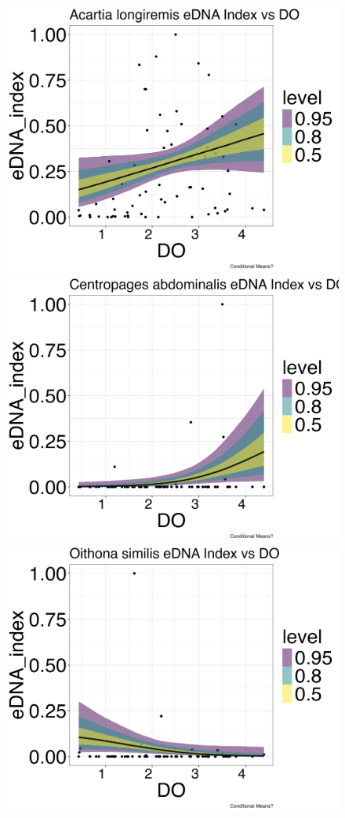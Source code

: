 \documentclass[12pt,twoside]{reedthesis}
\begin{document}
	\begin{figure}[h]
		\begin{center}
			\includegraphics[scale=0.25]{Alongiremis_ZOIB_Means_noOut}
			\includegraphics[scale=0.25]{Cabdominalis_ZOIB_Means_noOut}
			\includegraphics[scale=0.25]{Osimilis_ZOIB_Means_noOut}

\end{center}
\end{figure}
\end{document}
